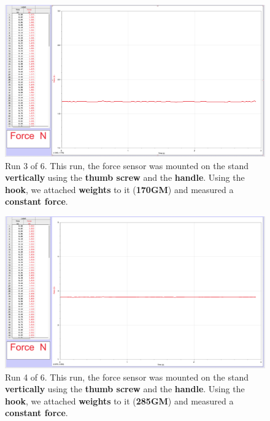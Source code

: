 \documentclass[idxtotoc,hyperref,openany]{labbook} %
\begin{document}
\begin{figure}[H] %
\begin{center}
\includegraphics[width=.90\linewidth]{images/Lab.05/Lab05.Run3.png}
\end{center}
\caption{Run 3 of 6. This run, the force sensor was mounted on the stand \textbf{vertically} using the \textbf{thumb screw} and the \textbf{handle}. Using the \textbf{hook}, we attached \textbf{weights} to it (\textbf{170GM}) and measured a \textbf{constant force}.}
\label{fig:Lab05-Run3}
\end{figure}

\begin{figure}[H] %
\begin{center}
\includegraphics[width=.90\linewidth]{images/Lab.05/Lab05.Run4.png}
\end{center}
\caption{Run 4 of 6. This run, the force sensor was mounted on the stand \textbf{vertically} using the \textbf{thumb screw} and the \textbf{handle}. Using the \textbf{hook}, we attached \textbf{weights} to it (\textbf{285GM}) and measured a \textbf{constant force}.}
\label{fig:Lab05-Run4}
\end{figure}
\end{document}
